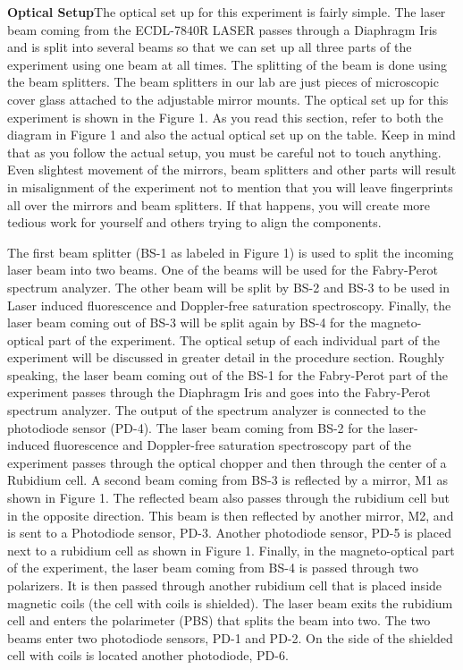 \documentclass{../lab}
\begin{document}
\textbf{Optical Setup}The optical set up for this experiment is fairly simple. The laser beam coming from the ECDL-7840R LASER passes through a Diaphragm Iris and is split into several beams so that we can set up all three parts of the experiment using one beam at all times. The splitting of the beam is done using the beam splitters. The beam splitters in our lab are just pieces of microscopic cover glass attached to the adjustable mirror mounts. The optical set up for this experiment is shown in the Figure 1. As you read this section, refer to both the diagram in Figure 1 and also the actual optical set up on the table. Keep in mind that as you follow the actual setup, you must be careful not to touch anything. Even slightest movement of the mirrors, beam splitters and other parts will result in misalignment of the experiment not to mention that you will leave fingerprints all over the mirrors and beam splitters. If that happens, you will create more tedious work for yourself and others trying to align the components.

The first beam splitter (BS-1 as labeled in Figure 1) is used to split the incoming laser beam into two beams. One of the beams will be used for the Fabry-Perot spectrum analyzer. The other beam will be split by BS-2 and BS-3 to be used in Laser induced fluorescence and Doppler-free saturation spectroscopy. Finally, the laser beam coming out of BS-3 will be split again by BS-4 for the magneto-optical part of the experiment. The optical setup of each individual part of the experiment will be discussed in greater detail in the procedure section. Roughly speaking, the laser beam coming out of the BS-1 for the Fabry-Perot part of the experiment passes through the Diaphragm Iris and goes into the Fabry-Perot spectrum analyzer. The output of the spectrum analyzer is connected to the photodiode sensor (PD-4). The laser beam coming from BS-2 for the laser-induced fluorescence and Doppler-free saturation spectroscopy part of the experiment passes through the optical chopper and then through the center of a Rubidium cell. A second beam coming from BS-3 is reflected by a mirror, M1 as shown in Figure 1. The reflected beam also passes through the rubidium cell but in the opposite direction. This beam is then reflected by another mirror, M2, and is sent to a Photodiode sensor, PD-3. Another photodiode sensor, PD-5 is placed next to a rubidium cell as shown in Figure 1. Finally, in the magneto-optical part of the experiment, the laser beam coming from BS-4 is passed through two polarizers. It is then passed through another rubidium cell that is placed inside magnetic coils (the cell with coils is shielded). The laser beam exits the rubidium cell and enters the polarimeter (PBS) that splits the beam into two. The two beams enter two photodiode sensors, PD-1 and PD-2. On the side of the shielded cell with coils is located another photodiode, PD-6.
\end{document}
